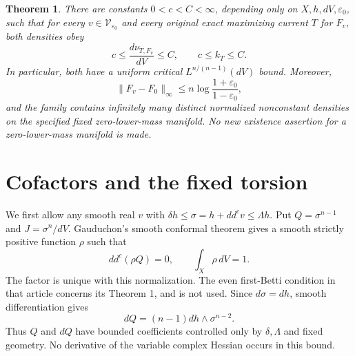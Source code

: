 \documentclass[11pt]{article}
\newtheorem{theorem}{Theorem}
\theoremstyle{remark}\newtheorem{remark}[theorem]{Remark}
\newcommand{\ddc}{dd^c}
\begin{document}
\begin{theorem}\label{thm:family}
There are constants $0<c<C<\infty$, depending only on
$X,h,dV,\varepsilon_0$, such that for every
$v\in\mathcal V_{\varepsilon_0}$ and every original exact maximizing
current $T$ for $F_v$, both densities obey
\[
 c\leq\frac{d\nu_{T,F_v}}{dV}\leq C,
 \qquad c\leq k_T\leq C.
\]
In particular, both have a uniform critical
$L^{n/(n-1)}(dV)$ bound. Moreover,
\[
 \|F_v-F_0\|_\infty
 \leq n\log\frac{1+\varepsilon_0}{1-\varepsilon_0},
\]
and the family contains infinitely many distinct normalized nonconstant
densities on the specified fixed zero-lower-mass manifold.
No new existence assertion for a zero-lower-mass manifold is made.
\end{theorem}

\section{Cofactors and the fixed torsion}
We first allow any smooth real $v$ with
$\delta h\leq\sigma=h+\ddc v\leq\Lambda h$.
Put $Q=\sigma^{n-1}$ and $J=\sigma^n/dV$.
Gauduchon's smooth conformal theorem
\cite[Th\'eor\`eme 2 and its full proof]{Gaud} gives a smooth
strictly positive function $\rho$ such that
\[
 \ddc(\rho Q)=0,\qquad\int_X\rho\,dV=1.
\]
The factor is unique with this normalization. The even first-Betti
condition in that article concerns its Theorem 1, and is not used.
Since $d\sigma=dh$, smooth differentiation gives
\begin{equation}\label{eq:dQ}
 dQ=(n-1)dh\wedge\sigma^{n-2}.
\end{equation}
Thus $Q$ and $dQ$ have bounded coefficients controlled only by
$\delta,\Lambda$ and fixed geometry. No derivative of the variable
complex Hessian occurs in this bound.
\end{document}
